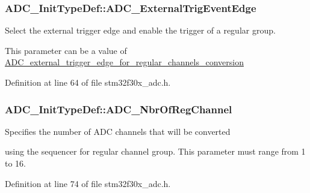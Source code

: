 \hypertarget{struct_a_d_c___init_type_def_adb84bdccfdfca06e30d1acc4e242017e}{
\subsubsection[{A\-D\-C\-\_\-\-External\-Trig\-Event\-Edge}]{ A\-D\-C\-\_\-\-Init\-Type\-Def\-::\-A\-D\-C\-\_\-\-External\-Trig\-Event\-Edge}}\label{struct_a_d_c___init_type_def_adb84bdccfdfca06e30d1acc4e242017e}
\begin{DoxyVerb}       Select the external trigger edge and enable the trigger of a regular group.                                               
\end{DoxyVerb}
 This parameter can be a value of \hyperlink{group___a_d_c__external__trigger__edge__for__regular__channels__conversion}{A\-D\-C\-\_\-external\-\_\-trigger\-\_\-edge\-\_\-for\-\_\-regular\-\_\-channels\-\_\-conversion} 

Definition at line 64 of file stm32f30x\-\_\-adc.\-h.

\hypertarget{struct_a_d_c___init_type_def_a94112eb5105aba4a2346f50c41942bd9}{
\subsubsection[{A\-D\-C\-\_\-\-Nbr\-Of\-Reg\-Channel}]{ A\-D\-C\-\_\-\-Init\-Type\-Def\-::\-A\-D\-C\-\_\-\-Nbr\-Of\-Reg\-Channel}}\label{struct_a_d_c___init_type_def_a94112eb5105aba4a2346f50c41942bd9}
\begin{DoxyVerb}            Specifies the number of ADC channels that will be converted
\end{DoxyVerb}
 using the sequencer for regular channel group. This parameter must range from 1 to 16. 

Definition at line 74 of file stm32f30x\-\_\-adc.\-h.

